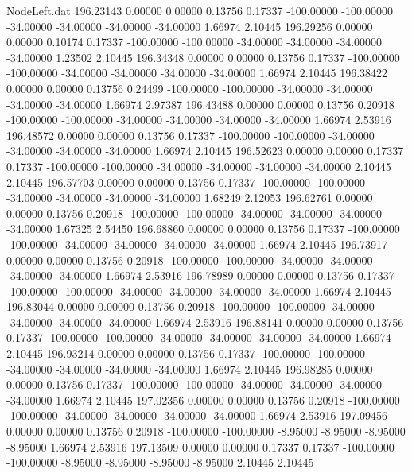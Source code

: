 \begin{filecontents}{NodeLeft.dat}
 196.23143    0.00000    0.00000     0.13756    0.17337 -100.00000 -100.00000  -34.00000  -34.00000  -34.00000  -34.00000    1.66974    2.10445
 196.29256    0.00000    0.00000     0.10174    0.17337 -100.00000 -100.00000  -34.00000  -34.00000  -34.00000  -34.00000    1.23502    2.10445
 196.34348    0.00000    0.00000     0.13756    0.17337 -100.00000 -100.00000  -34.00000  -34.00000  -34.00000  -34.00000    1.66974    2.10445
 196.38422    0.00000    0.00000     0.13756    0.24499 -100.00000 -100.00000  -34.00000  -34.00000  -34.00000  -34.00000    1.66974    2.97387
 196.43488    0.00000    0.00000     0.13756    0.20918 -100.00000 -100.00000  -34.00000  -34.00000  -34.00000  -34.00000    1.66974    2.53916
 196.48572    0.00000    0.00000     0.13756    0.17337 -100.00000 -100.00000  -34.00000  -34.00000  -34.00000  -34.00000    1.66974    2.10445
 196.52623    0.00000    0.00000     0.17337    0.17337 -100.00000 -100.00000  -34.00000  -34.00000  -34.00000  -34.00000    2.10445    2.10445
 196.57703    0.00000    0.00000     0.13756    0.17337 -100.00000 -100.00000  -34.00000  -34.00000  -34.00000  -34.00000    1.68249    2.12053
 196.62761    0.00000    0.00000     0.13756    0.20918 -100.00000 -100.00000  -34.00000  -34.00000  -34.00000  -34.00000    1.67325    2.54450
 196.68860    0.00000    0.00000     0.13756    0.17337 -100.00000 -100.00000  -34.00000  -34.00000  -34.00000  -34.00000    1.66974    2.10445
 196.73917    0.00000    0.00000     0.13756    0.20918 -100.00000 -100.00000  -34.00000  -34.00000  -34.00000  -34.00000    1.66974    2.53916
 196.78989    0.00000    0.00000     0.13756    0.17337 -100.00000 -100.00000  -34.00000  -34.00000  -34.00000  -34.00000    1.66974    2.10445
 196.83044    0.00000    0.00000     0.13756    0.20918 -100.00000 -100.00000  -34.00000  -34.00000  -34.00000  -34.00000    1.66974    2.53916
 196.88141    0.00000    0.00000     0.13756    0.17337 -100.00000 -100.00000  -34.00000  -34.00000  -34.00000  -34.00000    1.66974    2.10445
 196.93214    0.00000    0.00000     0.13756    0.17337 -100.00000 -100.00000  -34.00000  -34.00000  -34.00000  -34.00000    1.66974    2.10445
 196.98285    0.00000    0.00000     0.13756    0.17337 -100.00000 -100.00000  -34.00000  -34.00000  -34.00000  -34.00000    1.66974    2.10445
 197.02356    0.00000    0.00000     0.13756    0.20918 -100.00000 -100.00000  -34.00000  -34.00000  -34.00000  -34.00000    1.66974    2.53916
 197.09456    0.00000    0.00000     0.13756    0.20918 -100.00000 -100.00000   -8.95000   -8.95000   -8.95000   -8.95000    1.66974    2.53916
 197.13509    0.00000    0.00000     0.17337    0.17337 -100.00000 -100.00000   -8.95000   -8.95000   -8.95000   -8.95000    2.10445    2.10445

\end{filecontents}
